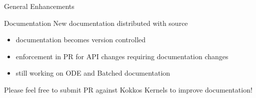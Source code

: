 \begin{frame}[fragile]

  {\Huge General Enhancements}

  \vspace{10pt}

\end{frame}

\begin{frame}[fragile]{Documentation}
  New documentation distributed with source
  \begin{itemize}
  \item documentation becomes version controlled
  \item enforcement in PR for API changes requiring documentation changes
  \item still working on ODE and Batched documentation
  \end{itemize}
  Please feel free to submit PR against Kokkos Kernels to improve documentation!
\end{frame}
